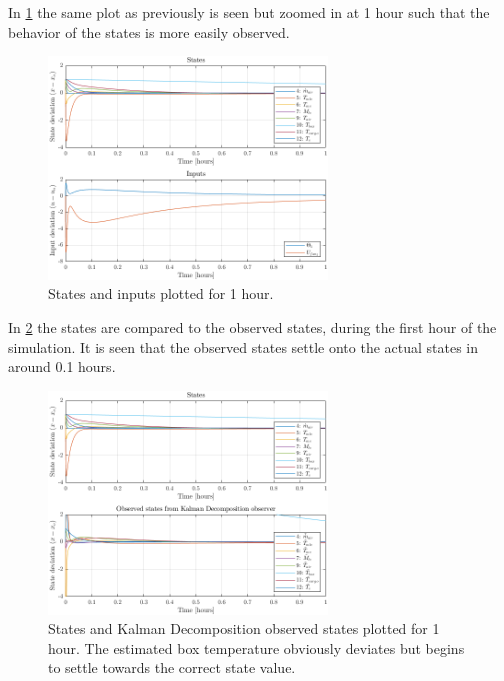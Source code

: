 \newpage
\noindent In \cref{fig:sim_stateInput1h} the same plot as previously is seen but zoomed in at 1 hour such that the behavior of the states is more easily observed.

\begin{figure}[h!]
	\centering
	\includegraphics[width=0.66\textwidth]{Graphics/fig_stateInput1h.png}
	\caption{States and inputs plotted for 1 hour.}
	\label{fig:sim_stateInput1h}
\end{figure}


\noindent In \cref{fig:sim_stateObsState1h} the states are compared to the observed states, during the first hour of the simulation. It is seen that the observed states settle onto the actual states in around 0.1 hours.

\begin{figure}[h!]
	\centering
	\includegraphics[width=0.66\textwidth]{Graphics/fig_stateObsState1h.png}
	\caption{States and Kalman Decomposition observed states plotted for 1 hour. The estimated box temperature obviously deviates but begins to settle towards the correct state value.}
	\label{fig:sim_stateObsState1h}
\end{figure}

